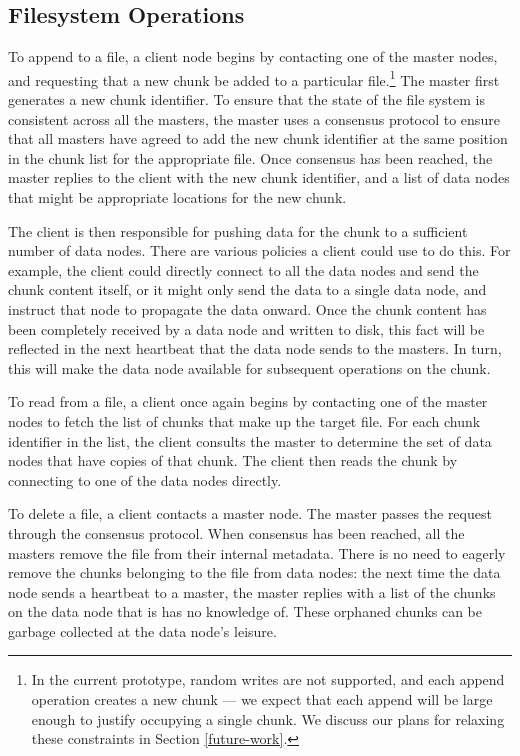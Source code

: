 \documentclass{article}
\begin{document}
\subsection{Filesystem Operations}
To append to a file, a client node begins by contacting one of the
master nodes, and requesting that a new chunk be added to a particular
file.\footnote{In the current prototype, random writes are not
  supported, and each append operation creates a new chunk --- we
  expect that each append will be large enough to justify occupying a
  single chunk. We discuss our plans for relaxing these constraints in
  Section \ref{future-work}.} The master first generates a new chunk
identifier. To ensure that the state of the file system is consistent
across all the masters, the master uses a consensus protocol to ensure
that all masters have agreed to add the new chunk identifier at the
same position in the chunk list for the appropriate file. Once
consensus has been reached, the master replies to the client with the
new chunk identifier, and a list of data nodes that might be
appropriate locations for the new chunk.

The client is then responsible for pushing data for the chunk to a
sufficient number of data nodes. There are various policies a client
could use to do this. For example, the client could directly connect
to all the data nodes and send the chunk content itself, or it might
only send the data to a single data node, and instruct that node to
propagate the data onward. Once the chunk content has been completely
received by a data node and written to disk, this fact will be
reflected in the next heartbeat that the data node sends to the
masters. In turn, this will make the data node available for
subsequent operations on the chunk.

To read from a file, a client once again begins by contacting one of
the master nodes to fetch the list of chunks that make up the target
file. For each chunk identifier in the list, the client consults the
master to determine the set of data nodes that have copies of that
chunk. The client then reads the chunk by connecting to one of the
data nodes directly.

To delete a file, a client contacts a master node. The master passes
the request through the consensus protocol. When consensus has been
reached, all the masters remove the file from their internal
metadata. There is no need to eagerly remove the chunks belonging to
the file from data nodes: the next time the data node sends a
heartbeat to a master, the master replies with a list of the chunks on
the data node that is has no knowledge of. These orphaned chunks can
be garbage collected at the data node's leisure.
\end{document}
